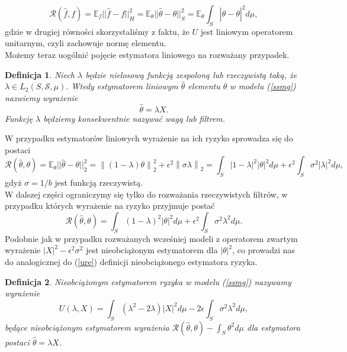 \documentclass{article}
\newtheorem{df}{Definicja}
\newcommand{\norm}[1]{\left\lVert#1\right\rVert}
\begin{document}
\begin{displaymath}
\mathcal{R}(\hat{f},f)=\mathbb{E}_f||\hat{f}-f||_H^2=\mathbb{E}_{\theta}||\hat{\theta}-\theta||_S^2=\mathbb{E}_{\theta}\int_S|\hat{\theta}-\theta |^2d\mu ,
\end{displaymath}
gdzie w drugiej równości skorzystaliśmy z faktu, że $U$ jest liniowym operatorem unitarnym, czyli zachowuje normę elementu.\\
Możemy teraz uogólnić pojęcie estymatora liniowego na rozważany przypadek.
\begin{df}
Niech $\lambda$ będzie nielosową funkcją zespoloną lub rzeczywistą taką, że $\lambda \in L_2(S,\mathcal{S},\mu )$. Wtedy estymatorem liniowym $\hat{\theta}$ elementu $\theta$ w modelu (\ref{ssmg}) nazwiemy wyrażenie 
\begin{displaymath}
\hat{\theta}=\lambda X.
\end{displaymath}
Funkcję $\lambda$ będziemy konsekwentnie nazywać wagą lub filtrem.
\end{df}
W przypadku estymatorów liniowych wyrażenie na ich ryzyko sprowadza się do postaci
\begin{displaymath}
\mathcal{R}(\hat{\theta},\theta )= \mathbb{E}_{\theta}||\hat{\theta}-\theta||_2^2=\norm{(1-\lambda)\theta}_2^2+\epsilon^2\norm{\sigma \lambda}_2=\int_S|1-\lambda|^2|\theta|^2d\mu +\epsilon^2\int_S \sigma^2 |\lambda|^2d\mu ,
\end{displaymath}
gdyż $\sigma=1/b$ jest funkcją rzeczywistą.\\
W dalszej części ograniczymy się tylko do rozważania rzeczywistych filtrów, w przypadku których wyrażenie na ryzyko przyjmuje postać
\begin{displaymath}
\mathcal{R}(\hat{\theta},\theta)=\int_S(1-\lambda)^2|\theta|^2d\mu +\epsilon^2\int_S \sigma^2 \lambda^2d\mu .
\end{displaymath}
Podobnie jak w przypadku rozważanych wcześniej modeli z operatorem zwartym wyrażenie $|X|^2-\epsilon^2\sigma^2$ jest nieobciążonym estymatorem dla $|\theta|^2$, co prowadzi nas do analogicznej do (\ref{ure}) definicji nieobciążonego estymatora ryzyka.
\begin{df}
Nieobciążonym estymatorem ryzyka w modelu (\ref{ssmg}) nazywamy wyrażenie
\begin{equation}\label{ure1}
U(\lambda , X)=\int_S (\lambda^2-2\lambda)|X|^2d\mu -2\epsilon\int_S\sigma^2\lambda^2 d\mu,
\end{equation}
będące nieobciążonym estymatorem wyrażenia $\mathcal{R}(\hat{\theta},\theta)-\int_S\theta^2d\mu $ dla estymatora postaci $\hat{\theta}=\lambda X$.
\end{df}
\end{document}
